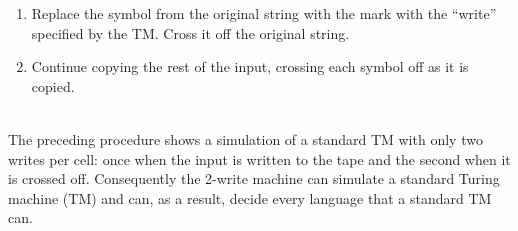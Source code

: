 \documentclass[12pt]{article}
\begin{document}
\begin{itemize}
\begin{enumerate}
\begin{enumerate}
			\item Replace the symbol from the original string with the mark with the ``write'' specified by the TM. Cross it off the original string.
			\item Continue copying the rest of the input, crossing each symbol off as it is copied.
		\end{enumerate}
	\end{enumerate}
	~\\[.2in] The preceding procedure shows a simulation of a standard TM with only two writes per cell: once when the input is written to the tape and the second when it is crossed off. Consequently the 2-write machine can simulate a standard Turing machine (TM) and can, as a result, decide every language that a standard TM can.
	\vspace{.2in}


\end{itemize}
\end{document}

